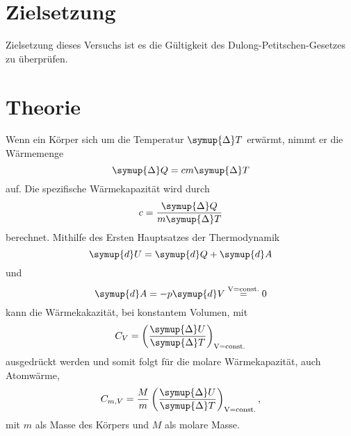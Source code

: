 \section{Zielsetzung}
Zielsetzung dieses Versuchs ist es die Gültigkeit des Dulong-Petitschen-Gesetzes zu überprüfen.
\section{Theorie}
\label{sec:Theorie}
Wenn ein Körper sich um die Temperatur $\symup{\Delta} T$ erwärmt, nimmt er die Wärmemenge
\begin{equation}
\symup{\Delta} Q = cm \symup{\Delta} T
\end{equation}
auf.
Die spezifische Wärmekapazität wird durch
\begin{equation}
c = \frac{\symup{\Delta} Q}{m\symup{\Delta}T}
\end{equation}
berechnet.
Mithilfe des Ersten Hauptsatzes der Thermodynamik
\begin{equation}
    \symup{d}U = \symup{d}Q + \symup{d}A
\end{equation}
und
\begin{equation}
    \symup{d}A = -p\symup{d}V \stackrel{\text{V=const.}}{=} 0
\end{equation}
kann die Wärmekakazität, bei konstantem Volumen, mit
\begin{equation}
    C_V = \left(\frac{\symup{\Delta}U}{\symup{\Delta}T}\right)_\text{V=const.}
\end{equation}
ausgedrückt werden und somit folgt für die molare Wärmekapazität, auch Atomwärme,
\begin{equation}
    \label{eq:molkap}
    C_{m,V} = \frac{M}{m}\left(\frac{\symup{\Delta}U}{\symup{\Delta}T}\right)_\text{V=const.},
\end{equation}
mit $m$ als Masse des Körpers und $M$ als molare Masse.
